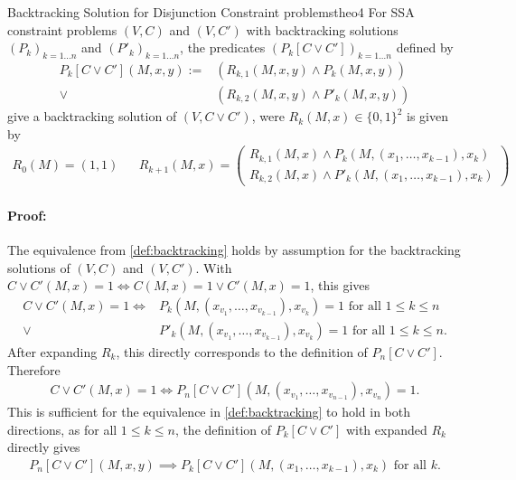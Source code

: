 \begin{theorem}{Backtracking Solution for Disjunction Constraint problems}{theo4}
    For SSA constraint problems $(V,C)$ and $(V,C')$ with backtracking
    solutions $(P_k)_{k=1\dots n}$ and $(P'_k)_{k=1\dots n}$, the
    predicates $(P_k[C\mathrel\lor C'])_{k=1\dots n}$ defined by
    \begin{align*}
        P_k[C\mathrel\lor C'](M,x,y):={}&\left(R_{k,1}(M,x,y)\mathrel\land P_k(M,x,y)\right)\\
                          \mathrel\lor{}&\left(R_{k,2}(M,x,y)\mathrel\land P'_k(M,x,y)\right)
    \end{align*}
    give a backtracking solution of $(V,C\mathrel\lor C')$, were $R_k(M,x)\in\{0,1\}^2$
    is given by 
    \begin{align*}
        R_0(M)=(1,1)&&
        R_{k+1}(M,x)=\left(
            \begin{array}{l}
                R_{k,1}(M,x)\mathrel\land P_k(M,(x_1,\dots,x_{k-1}),x_k)\\
                R_{k,2}(M,x)\mathrel\land P'_k(M,(x_1,\dots,x_{k-1}),x_k)
            \end{array}\right)
    \end{align*}
    \tcblower
    \paragraph*{Proof:} The equivalence from \autoref{def:backtracking}
                        holds by assumption for the backtracking solutions
                        of $(V,C)$ and $(V,C')$.
                        With $C\mathrel\lor C'(M,x)=1\iff C(M,x)=1\mathrel\lor C'(M,x)=1$,
                        this gives
    \begin{align*}
        C\mathrel\lor C'(M,x)=1\iff{}& P_k(M,(x_{v_1},\dots,x_{v_{k-1}}),x_{v_k})=1\text{ for all }1\leq k\leq n\\
                              \mathrel\lor{}& P'_k(M,(x_{v_1},\dots,x_{v_{k-1}}),x_{v_k})=1\text{ for all }1\leq k\leq n.
    \end{align*}
    After expanding $R_k$, this directly corresponds to the definition of
    $P_n[C\mathrel\lor C']$.
    Therefore
    \begin{align*}
        C\mathrel\lor C'(M,x)=1\iff{}P_n[C\mathrel\lor C'](M,(x_{v_1},\dots,x_{v_{n-1}}),x_{v_n})=1.
    \end{align*}
    This is sufficient for the equivalence in \autoref{def:backtracking} to hold
    in both directions, as for all $1\leq k\leq n$, the definition of
    $P_k[C\mathrel\lor C']$ with expanded $R_k$ directly gives
    \begin{align*}
        P_n[C\mathrel\lor C'](M,x,y)\implies P_k[C\mathrel\lor C'](M,(x_1,\dots,x_{k-1}),x_k)\text{ for all }k.
    \end{align*}
\end{theorem}
